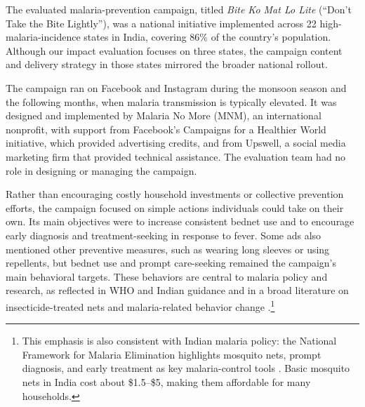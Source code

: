 The evaluated malaria-prevention campaign, titled \textit{Bite Ko Mat Lo Lite} (``Don’t Take the Bite Lightly''), was a national initiative implemented across 22 high-malaria-incidence states in India, covering 86\% of the country’s population. Although our impact evaluation focuses on three states, the campaign content and delivery strategy in those states mirrored the broader national rollout. 

The campaign ran on Facebook and Instagram during the monsoon season and the following months, when malaria transmission is typically elevated. It was designed and implemented by Malaria No More (MNM), an international nonprofit, with support from Facebook’s Campaigns for a Healthier World initiative, which provided advertising credits, and from Upswell, a social media marketing firm that provided technical assistance. The evaluation team had no role in designing or managing the campaign.

Rather than encouraging costly household investments or collective prevention efforts, the campaign focused on simple actions individuals could take on their own. Its main objectives were to increase consistent bednet use and to encourage early diagnosis and treatment-seeking in response to fever. Some ads also mentioned other preventive measures, such as wearing long sleeves or using repellents, but bednet use and prompt care-seeking remained the campaign's main behavioral targets. These behaviors are central to malaria policy and research, as reflected in WHO and Indian guidance and in a broad literature on insecticide-treated nets and malaria-related behavior change \citep{lengeler2004insecticide, cohen2010free, koenker2014strategic, world2025guidelines}.\footnote{This emphasis is also consistent with Indian malaria policy: the National Framework for Malaria Elimination highlights mosquito nets, prompt diagnosis, and early treatment as key malaria-control tools \citep{india2016nfme}. Basic mosquito nets in India cost about \$1.5--\$5, making them affordable for many households.}



